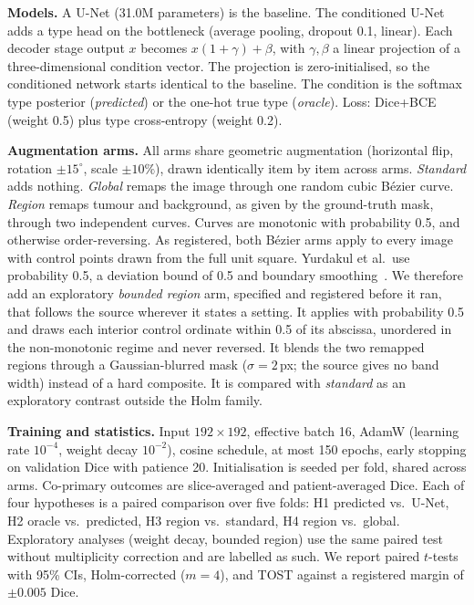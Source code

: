 \documentclass[runningheads]{llncs}
\begin{document}
\noindent\textbf{Models.}
A U-Net (31.0M parameters) is the baseline. The conditioned U-Net adds a type
head on the bottleneck (average pooling, dropout 0.1, linear). Each decoder stage
output $x$ becomes $x(1+\gamma)+\beta$, with $\gamma,\beta$ a linear projection
of a three-dimensional condition vector. The projection is zero-initialised, so
the conditioned network starts identical to the baseline. The condition is the
softmax type posterior (\emph{predicted}) or the one-hot true type
(\emph{oracle}). Loss: Dice+BCE (weight 0.5) plus type cross-entropy (weight 0.2).

\noindent\textbf{Augmentation arms.}
All arms share geometric augmentation (horizontal flip, rotation $\pm15^\circ$,
scale $\pm10\%$), drawn identically item by item across arms. \emph{Standard}
adds nothing. \emph{Global} remaps the image through one random cubic B\'ezier
curve. \emph{Region} remaps tumour and background, as given by the ground-truth
mask, through two independent curves. Curves are monotonic with probability 0.5,
and otherwise order-reversing. As registered, both B\'ezier arms apply to every
image with control points drawn from the full unit square. Yurdakul et al.\ use
probability 0.5, a deviation bound of 0.5 and boundary smoothing~\cite{yurdakul2026}.
We therefore add an exploratory \emph{bounded region} arm, specified and
registered before it ran, that follows the source wherever it states a setting.
It applies with probability 0.5 and draws each interior control ordinate within
0.5 of its abscissa, unordered in the non-monotonic regime and never reversed.
It blends the two remapped regions through a Gaussian-blurred mask
($\sigma=2$\,px; the source gives no band width) instead of a hard composite.
It is compared with \emph{standard} as an exploratory contrast outside the Holm
family.

\noindent\textbf{Training and statistics.}
Input $192\times192$, effective batch 16, AdamW (learning rate $10^{-4}$, weight
decay $10^{-2}$), cosine schedule, at most 150 epochs, early stopping on
validation Dice with patience 20. Initialisation is seeded per fold, shared across
arms. Co-primary outcomes are slice-averaged and patient-averaged Dice. Each of
four hypotheses is a paired comparison over five folds: H1 predicted vs.\ U-Net,
H2 oracle vs.\ predicted, H3 region vs.\ standard, H4 region vs.\ global. Exploratory analyses (weight decay, bounded region)
use the same paired test without multiplicity correction and are labelled as such. We
report paired $t$-tests with 95\% CIs, Holm-corrected ($m=4$), and TOST against
a registered margin of $\pm0.005$ Dice.
\end{document}
